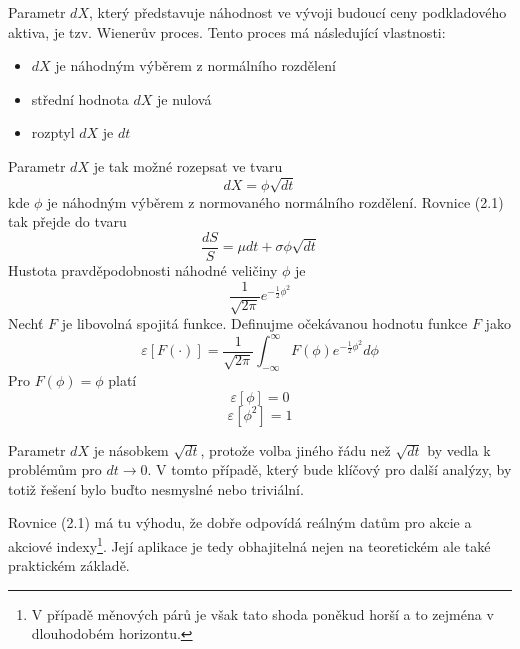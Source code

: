 \documentclass[a4paper]{book}
\begin{document}
Parametr $dX$, který představuje náhodnost ve vývoji budoucí ceny podkladového aktiva, je tzv. Wienerův proces. Tento proces má následující vlastnosti:
\begin{itemize}
\item $dX$ je náhodným výběrem z normálního rozdělení
\item střední hodnota $dX$ je nulová
\item rozptyl $dX$ je $dt$
\end{itemize}
Parametr $dX$ je tak možné rozepsat ve tvaru
\begin{equation*}
dX = \phi \sqrt{dt}
\end{equation*}
kde $\phi$ je náhodným výběrem z normovaného normálního rozdělení. Rovnice (2.1) tak přejde do tvaru
\begin{equation}
\frac{dS}{S}=\mu dt + \sigma \phi \sqrt{dt}
\end{equation}
Hustota pravděpodobnosti náhodné veličiny $\phi$ je
\begin{equation*}
\frac{1}{\sqrt{2 \pi}}e^{-\frac{1}{2}\phi^2}
\end{equation*}
Nechť $F$ je libovolná spojitá funkce. Definujme očekávanou hodnotu funkce $F$ jako
\begin{equation*}
\varepsilon[F(\cdot)]=\frac{1}{\sqrt{2 \pi}}\int_{-\infty}^{\infty}F(\phi)e^{-\frac{1}{2}\phi^2}d\phi
\end{equation*}
Pro $F(\phi) = \phi$ platí 
\begin{equation*}
\varepsilon[\phi]=0
\end{equation*}
\begin{equation*}
\varepsilon[\phi^2]=1
\end{equation*}

Parametr $dX$ je násobkem $\sqrt{dt}$, protože volba jiného řádu než $\sqrt{dt}$ by vedla k problémům pro $dt \rightarrow 0$. V tomto případě, který bude klíčový pro další analýzy, by totiž řešení bylo buďto nesmyslné nebo triviální.

Rovnice (2.1) má tu výhodu, že dobře odpovídá reálným datům pro akcie a akciové indexy\footnote{V případě měnových párů je však tato shoda poněkud horší a to zejména v dlouhodobém horizontu.}. Její aplikace je tedy obhajitelná nejen na teoretickém ale také praktickém základě.
\end{document}
